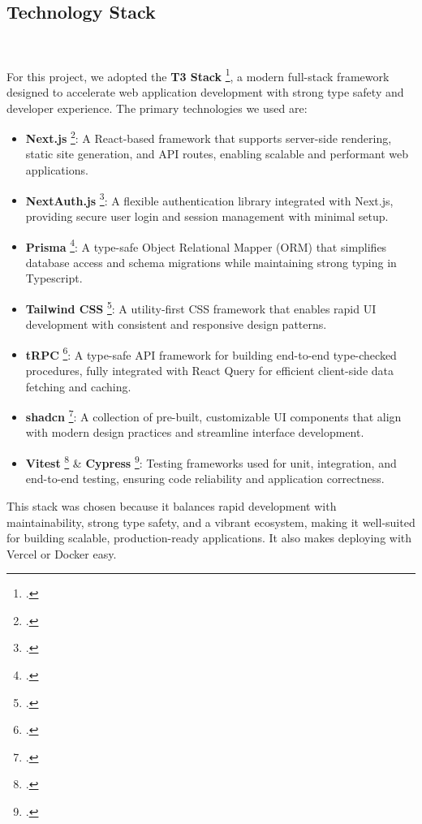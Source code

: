 
\subsection{Technology Stack} \

For this project, we adopted the \textbf{T3 Stack} \footcite{CreateT3App}, a modern full-stack framework designed to accelerate web application development with strong type safety and developer experience. The primary technologies we used are:


\begin{itemize}
	\item \textbf{Next.js} \footcite{NextjsVercelReact}:
	      A React-based framework that supports server-side rendering, static site generation, and API routes, enabling scalable and performant web applications.

	\item \textbf{NextAuth.js} \footcite{AuthjsAuthenticationWeb}:
	      A flexible authentication library integrated with Next.js, providing secure user login and session management with minimal setup.

	\item \textbf{Prisma} \footcite{PrismaInstantPostgres}:
	      A type-safe Object Relational Mapper (ORM) that simplifies database access and schema migrations while maintaining strong typing in Typescript.

	\item \textbf{Tailwind CSS} \footcite{TailwindCSSRapidly}:
	      A utility-first CSS framework that enables rapid UI development with consistent and responsive design patterns.

	\item \textbf{tRPC} \footcite{TRPCMoveFast2022}:
	      A type-safe API framework for building end-to-end type-checked procedures, fully integrated with React Query for efficient client-side data fetching and caching.

	\item \textbf{shadcn} \footcite{shadcnFoundationYourDesign}:
	      A collection of pre-built, customizable UI components that align with modern design practices and streamline interface development.

	\item \textbf{Vitest} \footcite{Vitest} \& \textbf{Cypress} \footcite{TestingFrameworksJavascript}:
	      Testing frameworks used for unit, integration, and end-to-end testing, ensuring code reliability and application correctness.
\end{itemize}

This stack was chosen because it balances rapid development with maintainability, strong type safety, and a vibrant ecosystem, making it well-suited for building scalable, production-ready applications. It also makes deploying with Vercel or Docker easy.

